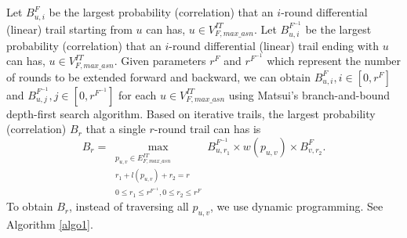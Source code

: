
Let $B^F_{u,i}$ be the largest probability (correlation) that an $i$-round differential (linear) trail starting from $u$ can has, $u\in V^{IT}_{F,max\_asn}$. Let $B^{F^{-1}}_{u,i}$ be the largest probability (correlation) that an $i$-round differential (linear) trail ending with $u$ can has, $u\in V^{IT}_{F,max\_asn}$. Given parameters $r^F$ and $r^{F^{-1}}$ which represent the number of rounds to be extended forward and backward, we can obtain $B^F_{u,i},i\in [0,r^F]$ and $B^{F^{-1}}_{u,j},j\in [0,r^{F^{-1}}]$ for each $u\in V^{IT}_{F,max\_asn}$ using Matsui's branch-and-bound depth-first search algorithm.  Based on iterative trails, the largest probability (correlation) $B_r$ that a single $r$-round trail can has is
\[
    B_r=\max\limits_{\substack{p_{u,v}\in E^{IT}_{F,max\_asn}\\r_1+l(p_{u,v})+r_2=r\\0\leq r_1\leq r^{F^{-1}},0\leq r_2\leq r^F}} B^{F^{-1}}_{u,r_1}\times w(p_{u,v})\times B^F_{v,r_2}.
\]
To obtain $B_r$, instead of traversing all $p_{u,v}$, we use dynamic programming. See Algorithm \ref{algo1}. 

